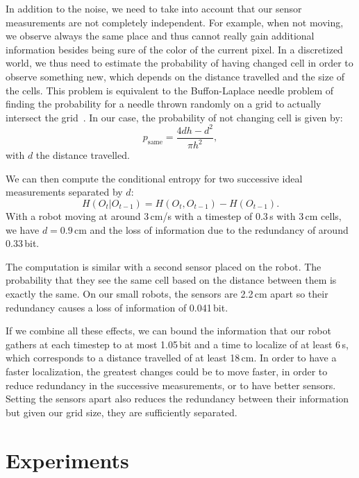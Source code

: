 \documentclass[letterpaper, 10pt, conference]{ieeeconf}
\begin{document}
In addition to the noise, we need to take into account that our sensor measurements are not completely independent.
For example, when not moving, we observe always the same place and thus cannot really gain additional information besides being sure of the color of the current pixel.
In a discretized world, we thus need to estimate the probability of having changed cell in order to observe something new, which depends on the distance travelled and the size of the cells.
This problem is equivalent to the Buffon-Laplace needle problem of finding the probability for a needle thrown randomly on a grid to actually intersect the grid~\cite{laplace1820prob}.
In our case, the probability of not changing cell is given by:
\begin{displaymath}
	p_\mathrm{same} = \frac{4d h - d^2}{\pi h^2},
\end{displaymath}
with $d$ the distance travelled.

We can then compute the conditional entropy for two successive ideal measurements separated by $d$:
\begin{displaymath}
	H(O_t | O_{t-1}) = H(O_t, O_{t-1}) - H(O_{t-1}).
\end{displaymath}
With a robot moving at around 3\,cm/s with a timestep of 0.3\,s with 3\,cm cells, we have $d=0.9$\,cm and the loss of information due to the redundancy of around 0.33\,bit.

The computation is similar with a second sensor placed on the robot.
The probability that they see the same cell based on the distance between them is exactly the same.
On our small robots, the sensors are 2.2\,cm apart so their redundancy causes a loss of information of 0.041\,bit.

If we combine all these effects, we can bound the information that our robot gathers at each timestep to at most 1.05\,bit and a time to localize of at least 6\,s, which corresponds to a distance travelled of at least 18\,cm.
In order to have a faster localization, the greatest changes could be to move faster, in order to reduce redundancy in the successive measurements, or to have better sensors.
Setting the sensors apart also reduces the redundancy between their information but given our grid size, they are sufficiently separated.

\section{Experiments}
\end{document}
